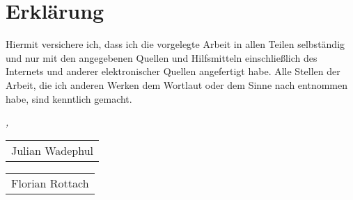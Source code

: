 \chapter*{Erklärung}
\thispagestyle{empty}

Hiermit versichere ich, dass ich die vorgelegte Arbeit in allen Teilen selbständig und nur mit 
den angegebenen Quellen und Hilfsmitteln einschließlich des Internets und anderer 
elektronischer Quellen angefertigt habe. Alle Stellen der Arbeit, die ich anderen Werken dem 
Wortlaut oder dem Sinne nach entnommen habe, sind kenntlich gemacht.


\bigskip
 
\noindent\textit{\myLocation, \myTime}

\smallskip

\begin{flushright}
    \begin{tabular}{m{8cm}}
        \\ \hline
        \centering Julian Wadephul \\
    \end{tabular}
\end{flushright}
\bigskip
\begin{flushright}
	\begin{tabular}{m{8cm}}
		\\ \hline
		\centering Florian Rottach \\
	\end{tabular}
\end{flushright}


